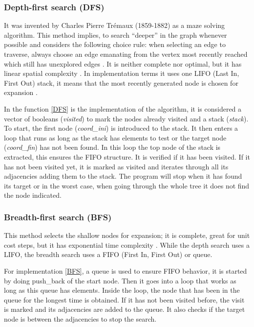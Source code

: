 \documentclass[11pt]{article}
\begin{document}
        \subsubsection{Depth-first search (DFS)}
        It was invented by Charles Pierre Trémaux (1859-1882) \cite{tremaux2010ecole} as a maze solving algorithm.
        This method implies, to search “deeper” in the graph whenever possible \cite{cormen2009introduction} and
        considers the following choice rule: when selecting an edge to traverse, always choose an edge emanating from the vertex most recently reached which still has unexplored edges \cite{tarjan1972depth}.
        It is neither complete nor optimal, but it has linear spatial complexity \cite{russell2004inteligencia}. In implementation terms it uses one LIFO (Last In, First Out) stack, it means that the most recently generated node is chosen for expansion \cite{russell2004inteligencia}.
        
        In the function \ref{DFS} is the implementation of the algorithm, it is considered a vector of booleans (\textit{visited}) to mark the nodes already visited and a stack (\textit{stack}). To start, the first node (\textit{coord\_ini}) is introduced to the stack. It then enters a loop that runs as long as the stack has elements to test or the target node (\textit{coord\_fin}) has not been found.
        In this loop the top node of the stack is extracted, this ensures the FIFO structure. It is verified if it has been visited. If it has not been visited yet, it is marked as visited and iterates through all its adjacencies adding them to the stack. The program will stop when it has found its target or in the worst case, when going through the whole tree it does not find the node indicated.
        

        \subsubsection{Breadth-first search (BFS)}
        This method selects the shallow nodes for expansion; it is complete, great for unit cost steps, but it has exponential time complexity \cite{russell2004inteligencia}.
        While the depth search uses a LIFO, the breadth search uses a FIFO (First In, First Out) or queue. 
        
        For implementation \ref{BFS}, a queue is used to ensure FIFO behavior, it is started by doing push\_back of the start node. Then it goes into a loop that works as long as this queue has elements. Inside the loop, the node that has been in the queue for the longest time is obtained. If it has not been visited before, the visit is marked and its adjacencies are added to the queue. It also checks if the target node is between the adjacencies to stop the search.
        
\end{document}
